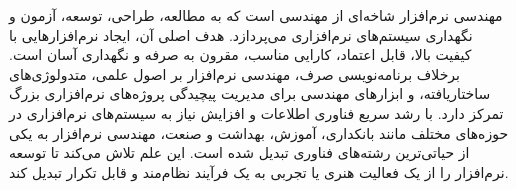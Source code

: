 مهندسی نرم‌افزار شاخه‌ای از مهندسی است که به مطالعه، طراحی، توسعه، آزمون و نگهداری سیستم‌های نرم‌افزاری می‌پردازد. هدف اصلی آن، ایجاد نرم‌افزارهایی با کیفیت بالا، قابل اعتماد، کارایی مناسب، مقرون به صرفه و نگهداری آسان است. برخلاف برنامه‌نویسی صرف، مهندسی نرم‌افزار بر اصول علمی، متدولوژی‌های ساختاریافته، و ابزارهای مهندسی برای مدیریت پیچیدگی پروژه‌های نرم‌افزاری بزرگ تمرکز دارد. با رشد سریع فناوری اطلاعات و افزایش نیاز به سیستم‌های نرم‌افزاری در حوزه‌های مختلف مانند بانکداری، آموزش، بهداشت و صنعت، مهندسی نرم‌افزار به یکی از حیاتی‌ترین رشته‌های فناوری تبدیل شده است. این علم تلاش می‌کند تا توسعه نرم‌افزار را از یک فعالیت هنری یا تجربی به یک فرآیند نظام‌مند و قابل تکرار تبدیل کند.\cite{Software-development-history}